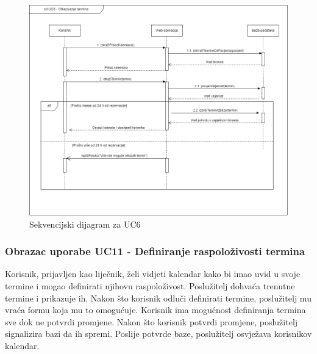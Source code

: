 				\begin{figure}[H]
			            \includegraphics[width=\textwidth]{slike/sd_uc6.png} %
			            \caption{Sekvencijski dijagram za UC6}
			            \label{fig:sd2} %
		        \end{figure}
		            
		        \eject
		            
		            
				\subsubsection{Obrazac uporabe UC11 - Definiranje raspoloživosti termina}
				
				Korisnik, prijavljen kao liječnik, želi vidjeti kalendar kako bi imao uvid u svoje termine i mogao definirati njihovu raspoloživost. Poslužitelj dohvaća trenutne termine i prikazuje ih. Nakon što korisnik odluči definirati termine, poslužitelj mu vraća formu koja mu to omogućuje. Korisnik ima mogućnost definiranja termina sve dok ne potvrdi promjene. Nakon što korisnik potvrdi promjene, poslužitelj signalizira bazi da ih spremi. Poslije potvrde baze, poslužitelj osvježava korisnikov kalendar.
				
